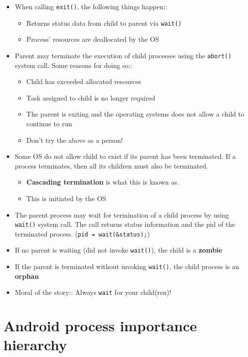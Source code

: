 \documentclass[12pt]{book}
\begin{document}
\begin{itemize}
    \item When calling \texttt{exit()}, the following things happen::
    \begin{itemize}
        \item Returns status data from child to parent via \texttt{wait()}
        \item Process' resources are deallocated by the OS
    \end{itemize}

    \item Parent may terminate the execution of child processes using the \texttt{abort()} system call. Some reasons for doing so::
    \begin{itemize}
        \item Child has exceeded allocated resources
        \item Task assigned to child is no longer required
        \item The parent is exiting and the operating systems does not allow a child to continue to run
        \item Don't try the above as a person!
    \end{itemize}
    \item Some OS do not allow child to exist if its parent has been terminated. If a process terminates, then all its children must also be terminated.
    \begin{itemize}
        \item \textbf{Cascading termination} is what this is known as.
        \item This is initiated by the OS
    \end{itemize} 
    \item The parent process may wait for termination of a child process by using \texttt{wait()} system call. The call returns status information and the pid of the terminated process. (\texttt{pid = wait(\&status);})
    \item If no parent is waiting (did not invoke \texttt{wait()}), the child is a \textbf{zombie}
    \item If the parent is terminated without invoking \texttt{wait()}, the child process is an \textbf{orphan}
    \item Moral of the story:: Always \texttt{wait} for your child(ren)!
\end{itemize}
\newpage
\section*{Android process importance hierarchy}
\end{document}
